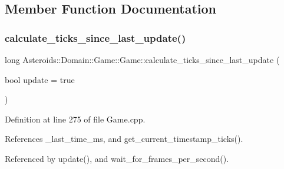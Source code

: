 \subsection{Member Function Documentation}
\mbox{\label{classAsteroids_1_1Domain_1_1Game_1_1Game_af8a67c4af1521c3184e873f79aad17f3}} 
\subsubsection{\texorpdfstring{calculate\+\_\+ticks\+\_\+since\+\_\+last\+\_\+update()}{calculate\_ticks\_since\_last\_update()}}
{\footnotesize\ttfamily long Asteroids\+::\+Domain\+::\+Game\+::\+Game\+::calculate\+\_\+ticks\+\_\+since\+\_\+last\+\_\+update (\begin{DoxyParamCaption}\item[{bool}]{update = {\ttfamily true} }\end{DoxyParamCaption})\hspace{0.3cm}{\ttfamily [private]}}



Definition at line 275 of file Game.\+cpp.



References \+\_\+last\+\_\+time\+\_\+ms, and get\+\_\+current\+\_\+timestamp\+\_\+ticks().



Referenced by update(), and wait\+\_\+for\+\_\+frames\+\_\+per\+\_\+second().

